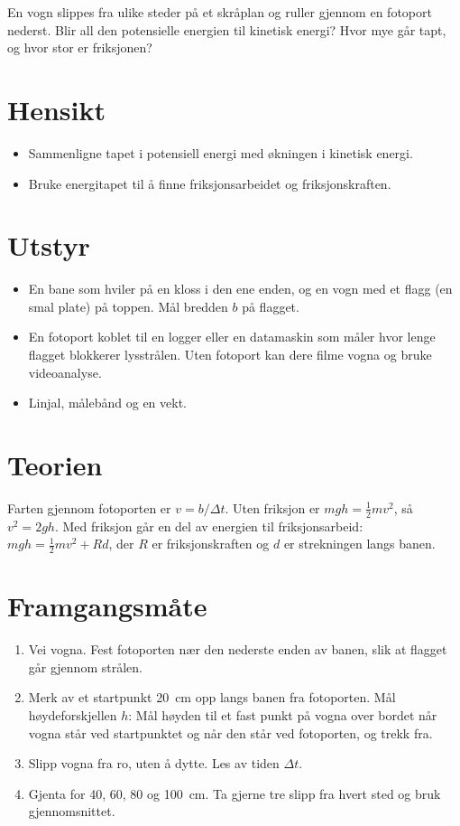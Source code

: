 \documentclass[11pt]{article}
\begin{document}

En vogn slippes fra ulike steder på et skråplan og ruller gjennom en fotoport nederst. Blir all den potensielle energien til kinetisk energi? Hvor mye går tapt, og hvor stor er friksjonen?

\section*{Hensikt}

\begin{itemize}
\item Sammenligne tapet i potensiell energi med økningen i kinetisk energi.
\item Bruke energitapet til å finne friksjonsarbeidet og friksjonskraften.
\end{itemize}

\section*{Utstyr}

\begin{itemize}
\item En bane som hviler på en kloss i den ene enden, og en vogn med et flagg (en smal plate) på toppen. Mål bredden $b$ på flagget.
\item En fotoport koblet til en logger eller en datamaskin som måler hvor lenge flagget blokkerer lysstrålen. Uten fotoport kan dere filme vogna og bruke videoanalyse.
\item Linjal, målebånd og en vekt.
\end{itemize}

\section*{Teorien}

Farten gjennom fotoporten er $v = b/Δt$. Uten friksjon er $mgh = \tfrac{1}{2}mv^{2}$, så $v^{2} = 2gh$. Med friksjon går en del av energien til friksjonsarbeid: $mgh = \tfrac{1}{2}mv^{2} + Rd$, der $R$ er friksjonskraften og $d$ er strekningen langs banen.

\section*{Framgangsmåte}

\begin{enumerate}
\item Vei vogna. Fest fotoporten nær den nederste enden av banen, slik at flagget går gjennom strålen.
\item Merk av et startpunkt 20~cm opp langs banen fra fotoporten. Mål høydeforskjellen $h$: Mål høyden til et fast punkt på vogna over bordet når vogna står ved startpunktet og når den står ved fotoporten, og trekk fra.
\item Slipp vogna fra ro, uten å dytte. Les av tiden $Δt$.
\item Gjenta for 40, 60, 80 og 100~cm. Ta gjerne tre slipp fra hvert sted og bruk gjennomsnittet.
\end{enumerate}
\end{document}
